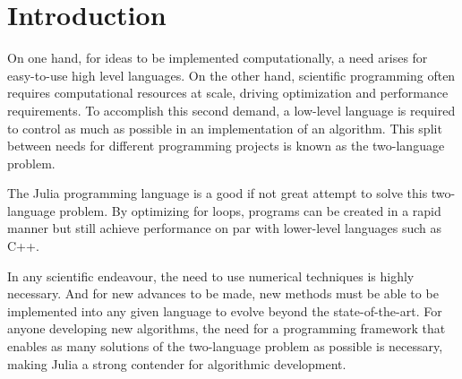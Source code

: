 \documentclass{juliacon}
\begin{document}


\maketitle

\begin{abstract}

We discuss implementation of a graphical user interface for tensor operations in scientific simulations related to entanglement renormalization. We call this software DMRGenie based on its heavy reliance on Genie which is a well-known software package for web applications. We also discuss the deployment of the software. Scientific simulations with a tensor network-based framework of quantum algorithm methods are now possible through this tool without lengthy start-up or learning times.

\end{abstract}


\section{Introduction}

On one hand, for ideas to be implemented computationally, a need arises for easy-to-use high level languages. On the other hand, scientific programming often requires computational resources at scale, driving optimization and performance requirements. To accomplish this second demand, a low-level language is required to control as much as possible in an implementation of an algorithm. This split between needs for different programming projects is known as the two-language problem.

The Julia programming language is a good if not great attempt to solve this two-language problem. By optimizing for loops, programs can be created in a rapid manner but still achieve performance on par with lower-level languages such as C++. 

In any scientific endeavour, the need to use numerical techniques is highly necessary. And for new advances to be made, new methods must be able to be implemented into any given language to evolve beyond the state-of-the-art. For anyone developing new algorithms, the need for a programming framework that enables as many solutions of the two-language problem as possible is necessary, making Julia a strong contender for algorithmic development.
\end{document}
